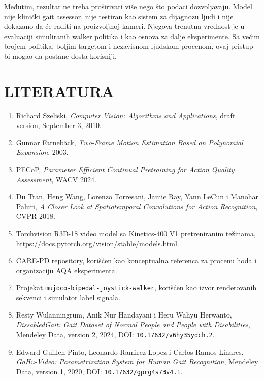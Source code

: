 ﻿\documentclass[12pt,a4paper]{report}
\begin{document}
Međutim, rezultat ne treba proširivati više nego što podaci dozvoljavaju.
Model nije klinički gait assessor, nije testiran kao sistem za dijagnozu ljudi
i nije dokazano da će raditi na proizvoljnoj kameri. Njegova trenutna vrednost
je u evaluaciji simuliranih walker politika i kao osnova za dalje eksperimente.
Sa većim brojem politika, boljim targetom i nezavisnom ljudskom procenom, ovaj
pristup bi mogao da postane dosta korisniji.

\chapter*{LITERATURA}

\begin{enumerate}
  \item Richard Szeliski, \textit{Computer Vision: Algorithms and Applications},
  draft version, September 3, 2010.

  \item Gunnar Farnebäck, \textit{Two-Frame Motion Estimation Based on Polynomial
  Expansion}, 2003.

  \item PECoP, \textit{Parameter Efficient Continual Pretraining for Action
  Quality Assessment}, WACV 2024.

  \item Du Tran, Heng Wang, Lorenzo Torresani, Jamie Ray, Yann LeCun i Manohar
  Paluri, \textit{A Closer Look at Spatiotemporal Convolutions for Action
  Recognition}, CVPR 2018.

  \item Torchvision R3D-18 video model sa Kinetics-400 V1 pretreniranim težinama,
  \url{https://docs.pytorch.org/vision/stable/models.html}.

  \item CARE-PD repository, korišćen kao konceptualna referenca za procenu hoda i
  organizaciju AQA eksperimenta.

  \item Projekat \texttt{mujoco-bipedal-joystick-walker}, korišćen kao izvor
  renderovanih sekvenci i simulator label signala.

  \item Resty Wulanningrum, Anik Nur Handayani i Heru Wahyu Herwanto,
  \textit{DissabledGait: Gait Dataset of Normal People and People with
  Disabilities}, Mendeley Data, version 2, 2024,
  DOI: \texttt{10.17632/v6hy35ydch.2}.

  \item Edward Guillen Pinto, Leonardo Ramirez Lopez i Carlos Ramos Linares,
  \textit{GaHu-Video: Parametrization System for Human Gait Recognition},
  Mendeley Data, version 1, 2020, DOI: \texttt{10.17632/gprg4s73v4.1}.


\end{enumerate}
\end{document}

